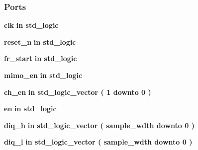 \subsubsection*{Ports}
 \begin{DoxyCompactItemize}
\item 
{\bf clk}  {\bfseries {\bfseries \textcolor{keywordflow}{in}\textcolor{vhdlchar}{ }}} {\bfseries \textcolor{comment}{std\+\_\+logic}\textcolor{vhdlchar}{ }} 
\item 
{\bf reset\+\_\+n}  {\bfseries {\bfseries \textcolor{keywordflow}{in}\textcolor{vhdlchar}{ }}} {\bfseries \textcolor{comment}{std\+\_\+logic}\textcolor{vhdlchar}{ }} 
\item 
{\bf fr\+\_\+start}  {\bfseries {\bfseries \textcolor{keywordflow}{in}\textcolor{vhdlchar}{ }}} {\bfseries \textcolor{comment}{std\+\_\+logic}\textcolor{vhdlchar}{ }} 
\item 
{\bf mimo\+\_\+en}  {\bfseries {\bfseries \textcolor{keywordflow}{in}\textcolor{vhdlchar}{ }}} {\bfseries \textcolor{comment}{std\+\_\+logic}\textcolor{vhdlchar}{ }} 
\item 
{\bf ch\+\_\+en}  {\bfseries {\bfseries \textcolor{keywordflow}{in}\textcolor{vhdlchar}{ }}} {\bfseries \textcolor{comment}{std\+\_\+logic\+\_\+vector}\textcolor{vhdlchar}{ }\textcolor{vhdlchar}{(}\textcolor{vhdlchar}{ }\textcolor{vhdlchar}{ } \textcolor{vhdldigit}{1} \textcolor{vhdlchar}{ }\textcolor{keywordflow}{downto}\textcolor{vhdlchar}{ }\textcolor{vhdlchar}{ } \textcolor{vhdldigit}{0} \textcolor{vhdlchar}{ }\textcolor{vhdlchar}{)}\textcolor{vhdlchar}{ }} 
\item 
{\bf en}  {\bfseries {\bfseries \textcolor{keywordflow}{in}\textcolor{vhdlchar}{ }}} {\bfseries \textcolor{comment}{std\+\_\+logic}\textcolor{vhdlchar}{ }} 
\item 
{\bf diq\+\_\+h}  {\bfseries {\bfseries \textcolor{keywordflow}{in}\textcolor{vhdlchar}{ }}} {\bfseries \textcolor{comment}{std\+\_\+logic\+\_\+vector}\textcolor{vhdlchar}{ }\textcolor{vhdlchar}{(}\textcolor{vhdlchar}{ }\textcolor{vhdlchar}{ }\textcolor{vhdlchar}{ }\textcolor{vhdlchar}{ }{\bfseries {\bf sample\+\_\+wdth}} \textcolor{vhdlchar}{ }\textcolor{keywordflow}{downto}\textcolor{vhdlchar}{ }\textcolor{vhdlchar}{ } \textcolor{vhdldigit}{0} \textcolor{vhdlchar}{ }\textcolor{vhdlchar}{)}\textcolor{vhdlchar}{ }} 
\item 
{\bf diq\+\_\+l}  {\bfseries {\bfseries \textcolor{keywordflow}{in}\textcolor{vhdlchar}{ }}} {\bfseries \textcolor{comment}{std\+\_\+logic\+\_\+vector}\textcolor{vhdlchar}{ }\textcolor{vhdlchar}{(}\textcolor{vhdlchar}{ }\textcolor{vhdlchar}{ }\textcolor{vhdlchar}{ }\textcolor{vhdlchar}{ }{\bfseries {\bf sample\+\_\+wdth}} \textcolor{vhdlchar}{ }\textcolor{keywordflow}{downto}\textcolor{vhdlchar}{ }\textcolor{vhdlchar}{ } \textcolor{vhdldigit}{0} \textcolor{vhdlchar}{ }\textcolor{vhdlchar}{)}\textcolor{vhdlchar}{ }} 

\end{DoxyCompactItemize}
